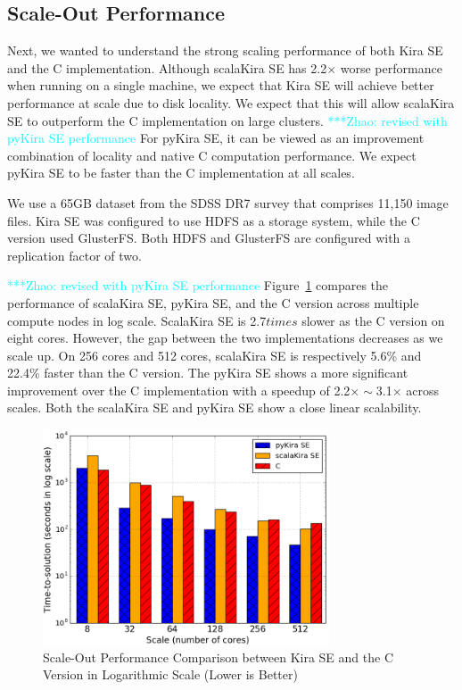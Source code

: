 \documentclass[10pt,journal,compsoc]{IEEEtran}
\newcommand{\zhaonote}[1]{{\textcolor{cyan}    { ***Zhao:      #1 }}}
\newcommand{\zhaonote}[1]{}
\begin{document}
\subsection{Scale-Out Performance}
\label{sec:Performance-scaleout}

Next, we wanted to understand the strong scaling performance of both Kira SE and the C
implementation. Although scalaKira SE has 2.2$\times$ worse performance when running on
a single machine, we expect that Kira SE will achieve better performance at scale due
to disk locality. We expect that this will allow scalaKira SE to outperform the C implementation
on large clusters. 
\zhaonote{revised with pyKira SE performance}
For pyKira SE, it can be viewed as an improvement combination of locality and native C
computation performance. We expect pyKira SE to be faster than the C implementation
at all scales.

We use a 65GB dataset from the SDSS DR7 survey that comprises 11,150 image files.
Kira SE was configured to use HDFS as a storage system, while the C version used GlusterFS. 
Both HDFS and GlusterFS are configured with a replication factor of two.

\zhaonote{revised with pyKira SE performance}
Figure~\ref{fig:scaleout} compares the performance of scalaKira SE, pyKira SE, and the C version across
multiple compute nodes in log scale. 
ScalaKira SE is 2.7$times$ slower as the C version on eight cores. 
However, the gap between the two implementations decreases as we scale up. 
On 256 cores and 512 cores, scalaKira SE is respectively 5.6\% and 22.4\% faster than the C version.
The pyKira SE shows a more significant improvement over the C implementation with a speedup of
2.2$\times\sim$3.1$\times$ across scales.
Both the scalaKira SE and pyKira SE show a close linear scalability.

\begin{figure}[h]
	\begin{center}
		\includegraphics[width=85mm]{pictures/scaleout}
		\caption{Scale-Out Performance Comparison between Kira SE and the C Version in Logarithmic Scale (Lower is Better)
		\label{fig:scaleout}}
  	\end{center}
\end{figure}
\end{document}
